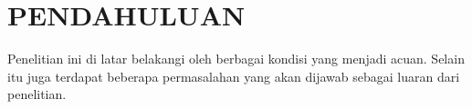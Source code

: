 \chapter{PENDAHULUAN}
\label{chap:pendahuluan}

Penelitian ini di latar belakangi oleh berbagai kondisi yang menjadi acuan.
Selain itu juga terdapat beberapa permasalahan yang akan dijawab sebagai luaran dari penelitian.






